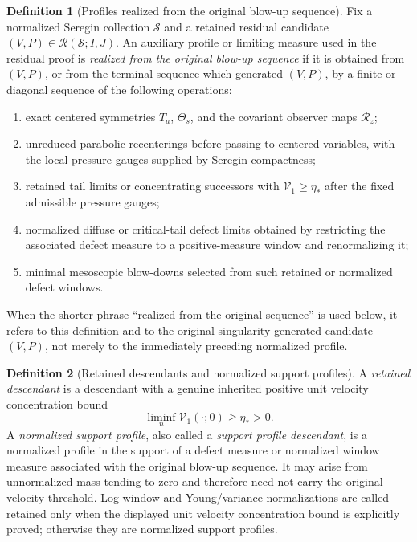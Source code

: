 \documentclass[11pt]{amsart}
\numberwithin{equation}{section}
\theoremstyle{plain}
\theoremstyle{definition}
\newtheorem{definition}[definition]{Definition}
\theoremstyle{remark}
\newcommand{\calS}{\mathcal S}
\newcommand{\calR}{\mathcal R}
\newcommand{\Vel}{\mathcal V}
\begin{document}
\begin{definition}[Profiles realized from the original blow-up sequence]
\label{def:sequence-realized-residual-object}
Fix a normalized Seregin collection \(\calS\) and a retained residual candidate
\((V,P)\in\calR(\calS;I,J)\).  An auxiliary profile or limiting measure used in the residual proof is
\emph{realized from the original blow-up sequence} if it is obtained from \((V,P)\), or from the terminal
sequence which generated \((V,P)\), by a finite or diagonal sequence of the
following operations:
\begin{enumerate}[label=\textup{(\roman*)}]
   \item exact centered symmetries \(T_a\), \(\Theta_s\), and the covariant
   observer maps \(\calR_z\);
   \item unreduced parabolic recenterings before passing to centered variables, with
   the local pressure gauges supplied by Seregin compactness;
   \item retained tail limits or concentrating successors with
   \(\Vel_1\ge\eta_*\) after the fixed admissible pressure gauges;
   \item normalized diffuse or critical-tail defect limits obtained by
   restricting the associated defect measure to a positive-measure window and
   renormalizing it;
   \item minimal mesoscopic blow-downs selected from such retained or
   normalized defect windows.
\end{enumerate}
When the shorter phrase ``realized from the original sequence'' is used below,
it refers to this definition and to the original singularity-generated
candidate \((V,P)\), not merely to the immediately preceding normalized profile.
\end{definition}

\begin{definition}[Retained descendants and normalized support profiles]
\label{def:retained-vs-support-profile-descendant}
A \emph{retained descendant} is a descendant with a genuine inherited positive
unit velocity concentration bound
\[
   \liminf_n\Vel_1(\cdot;0)\ge\eta_*>0 .
\]
A \emph{normalized support profile}, also called a \emph{support profile
descendant}, is a normalized profile in the support of a defect measure or
normalized window measure associated with the original blow-up sequence.  It may arise from
unnormalized mass tending to zero and therefore need not carry the original
velocity threshold.  Log-window and Young/variance normalizations are called
retained only when the displayed unit velocity concentration bound is explicitly proved;
otherwise they are normalized support profiles.
\end{definition}
\end{document}
